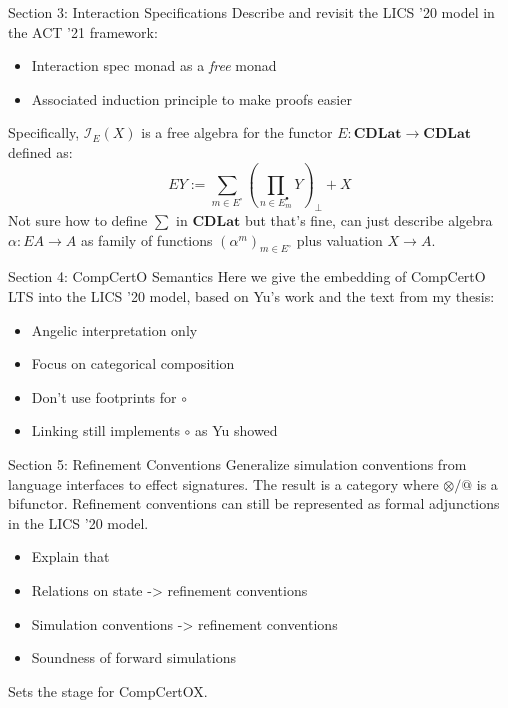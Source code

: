 \documentclass[aspectratio=1610,mathserif]{beamer}
\begin{document}
\begin{frame}{Section 3: Interaction Specifications}
  Describe and revisit the LICS '20 model
  in the ACT '21 framework:
  \begin{itemize}
    \item Interaction spec monad as a \emph{free} monad
    \item Associated induction principle to make proofs easier
  \end{itemize}

  Specifically, $\mathcal{I}_E(X)$ is a free algebra for
  the functor $E : \mathbf{CDLat} \rightarrow \mathbf{CDLat}$
  defined as:
  \[
    EY :=
     \sum_{m \in E^\circ} \left( \prod_{n \in E^\bullet_m} Y \right)_\bot
     + X
  \]
  Not sure how to define $\sum$ in $\mathbf{CDLat}$ but that's fine,
  can just describe algebra $\alpha : EA \rightarrow A$
  as family of functions $(\alpha^m)_{m \in E^\circ}$
  plus valuation $X \rightarrow A$.
\end{frame}

\begin{frame}{Section 4: CompCertO Semantics}
  Here we give the embedding of CompCertO LTS into the LICS '20 model,
  based on Yu's work and the text from my thesis:
  \begin{itemize}
    \item Angelic interpretation only
    \item Focus on categorical composition
    \item Don't use footprints for $\circ$
    \item Linking still implements $\circ$ as Yu showed
  \end{itemize}
\end{frame}

\begin{frame}{Section 5: Refinement Conventions}
  Generalize simulation conventions
  from language interfaces to effect signatures.
  The result is a category where $\otimes/@$ is a bifunctor.
  Refinement conventions can still be represented as
  formal adjunctions in the LICS '20 model.

  \begin{itemize}
    \item Explain that
    \item Relations on state -> refinement conventions
    \item Simulation conventions -> refinement conventions
    \item Soundness of forward simulations
  \end{itemize}

  Sets the stage for CompCertOX.
\end{frame}
\end{document}
